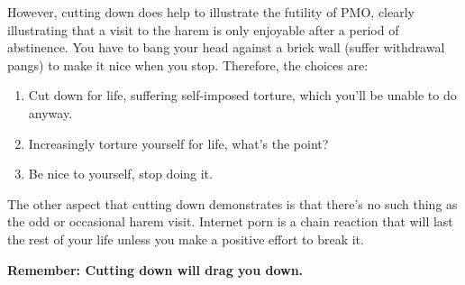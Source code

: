 \documentclass[easypeasy.tex]{subfiles}
\begin{document}
However, cutting down does help to illustrate the futility of PMO, clearly illustrating that a visit to the harem is only enjoyable after a period of abstinence. You have to bang your head against a brick wall (suffer withdrawal pangs) to make it nice when you stop. Therefore, the choices are:
\begin{enumerate}
  \item Cut down for life, suffering self-imposed torture, which you'll be unable to do anyway.

  \item Increasingly torture yourself for life, what's the point?

  \item Be nice to yourself, stop doing it.

\end{enumerate}
The other aspect that cutting down demonstrates is that there's no such thing as the odd or occasional harem visit. Internet porn is a chain reaction that will last the rest of your life unless you make a positive effort to break it.

\textbf{Remember: Cutting down will drag you down.}
\end{document}
